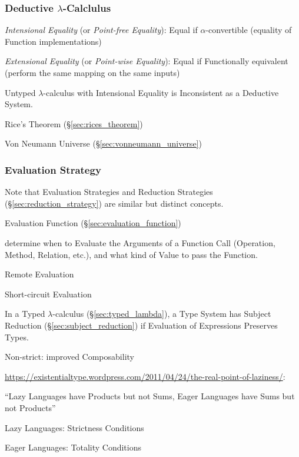 \subsubsection{Deductive $\lambda$-Calclulus}\label{sec:deductive_lambda}

\emph{Intensional Equality} (or \emph{Point-free Equality}): Equal if
$\alpha$-convertible (equality of Function implementations)

\emph{Extensional Equality} (or \emph{Point-wise Equality}): Equal if
Functionally equivalent (perform the same mapping on the same inputs)

Untyped $\lambda$-calculus with Intensional Equality is Inconsistent
as a Deductive System.

Rice's Theorem (\S\ref{sec:rices_theorem})

Von Neumann Universe (\S\ref{sec:vonneumann_universe})



\subsubsection{Evaluation Strategy}\label{sec:evaluation_strategy}

\fist Note that Evaluation Strategies and Reduction Strategies
(\S\ref{sec:reduction_strategy}) are similar but distinct concepts.

Evaluation Function (\S\ref{sec:evaluation_function})

determine when to Evaluate the Arguments of a Function Call
(Operation, Method, Relation, etc.), and what kind of Value to pass
the Function.

Remote Evaluation

Short-circuit Evaluation

In a Typed $\lambda$-calculus (\S\ref{sec:typed_lambda}), a Type
System has Subject Reduction (\S\ref{sec:subject_reduction}) if
Evaluation of Expressions Preserves Types.

Non-strict: improved Composability %

\url{https://existentialtype.wordpress.com/2011/04/24/the-real-point-of-laziness/}:

``Lazy Languages have Products but not Sums, Eager Languages have Sums
but not Products''

Lazy Languages: Strictness Conditions %

Eager Languages: Totality Conditions %


\asterism


